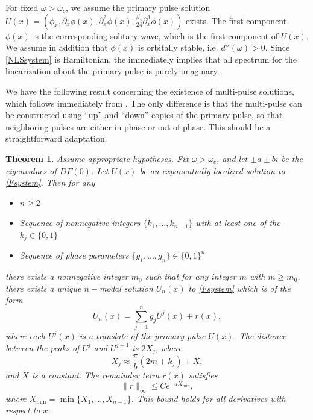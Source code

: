 \documentclass[12pt]{article}
\newtheorem{theorem}{Theorem}
\begin{document}
For fixed $\omega > \omega_c$, we assume the primary pulse solution $U(x) = (\phi_x, \partial_x \phi(x), \partial_x^2 \phi(x), \frac{\beta_4}{24} \partial_x^3 \phi(x))$ exists. The first component $\phi(x)$ is the corresponding solitary wave, which is the first component of $U(x)$. We assume in addition that $\phi(x)$ is orbitally stable, i.e. $d''(\omega) > 0$. Since \cref{NLSsystem} is Hamiltonian, the immediately implies that all spectrum for the linearization about the primary pulse is purely imaginary.

We have the following result concerning the existence of multi-pulse solutions, which follows immediately from \cite[Theorem~3.6]{SandstedeStrut}. The only difference is that the multi-pulse can be constructed using ``up'' and ``down'' copies of the primary pulse, so that neighboring pulses are either in phase or out of phase. This should be a straightforward adaptation.

\begin{theorem}\label{theorem:multiexist}
Assume appropriate hypotheses. Fix $\omega > \omega_c$, and let $\pm a \pm bi$ be the eigenvalues of $DF(0)$. Let $U(x)$ be an exponentially localized solution to \cref{Fsystem}. Then for any 
\begin{itemize}
\item $n \geq 2$
\item Sequence of nonnegative integers $\{ k_1, \dots, k_{n-1} \}$ with at least one of the $k_j \in \{0, 1 \}$
\item Sequence of phase parameters $\{ g_1, \dots, g_{n} \} \in \{0, 1\}^n$
\end{itemize}
there exists a nonnegative integer $m_0$ such that for any integer $m$ with $m \geq m_0$, there exists a unique $n-$modal solution $U_n(x)$ to \cref{Fsystem} which is of the form
  \begin{equation}\label{qn}
  U_n(x) = \sum_{j = 1}^{n} g_j U^j(x) + r(x),
  \end{equation}
  where each $U^j(x)$ is a translate of the primary pulse $U(x)$. The distance between the peaks of $U^j$ and $U^{j+1}$ is $2 X_j$, where
  \begin{equation*}
  X_j \approx \frac{\pi}{b}(2 m + k_j) + \tilde{X},
  \end{equation*}
  and $\tilde{X}$ is a constant. The remainder term $r(x)$ satisfies
  \begin{equation}\label{rbound}
  \|r\|_\infty \leq C e^{-a X_{\mathrm{min}}},
  \end{equation}
  where $X_{\mathrm{min}} = \min\{X_1, \dots, X_{n-1}\}$. This bound holds for all derivatives with respect to $x$.
\end{theorem}
\end{document}
